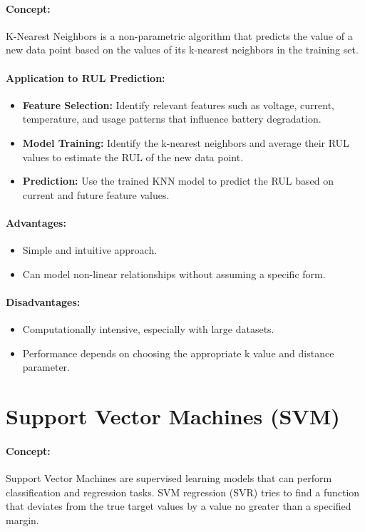 \paragraph{Concept:}
K-Nearest Neighbors is a non-parametric algorithm that predicts the value of a new data point based on the values of its k-nearest neighbors in the training set.
\paragraph{Application to RUL Prediction:}
\begin{itemize}
    \item \textbf{Feature Selection:} Identify relevant features such as voltage, current, temperature, and usage patterns that influence battery degradation.
    \item \textbf{Model Training:} Identify the k-nearest neighbors and average their RUL values to estimate the RUL of the new data point.
    \item \textbf{Prediction:} Use the trained KNN model to predict the RUL based on current and future feature values.
\end{itemize}
\paragraph{Advantages:}
\begin{itemize}
    \item Simple and intuitive approach.
    \item Can model non-linear relationships without assuming a specific form.
\end{itemize}
\paragraph{Disadvantages:}
\begin{itemize}
    \item Computationally intensive, especially with large datasets.
    \item Performance depends on choosing the appropriate k value and distance parameter.
\end{itemize}

\section{Support Vector Machines (SVM)}
\paragraph{Concept:}
Support Vector Machines are supervised learning models that can perform classification and regression tasks. SVM regression (SVR) tries to find a function that deviates from the true target values by a value no greater than a specified margin.
